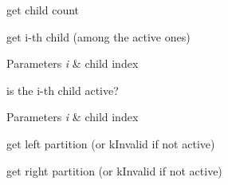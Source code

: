 get child count

get i-\/th child (among the active ones)


\begin{DoxyParams}{Parameters}
{\em i} & child index\\
\hline
\end{DoxyParams}
is the i-\/th child active?


\begin{DoxyParams}{Parameters}
{\em i} & child index\\
\hline
\end{DoxyParams}
get left partition (or k\+Invalid if not active)

get right partition (or k\+Invalid if not active)